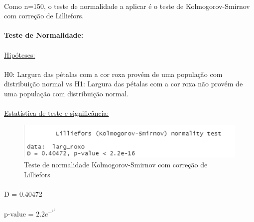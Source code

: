 \documentclass{article}
\begin{document}
\paragraph{} Como n=150, o teste de normalidade a aplicar é o teste de Kolmogorov-Smirnov com correção de Lilliefors.
\paragraph{} 
\textbf{Teste de Normalidade:}
\paragraph{}
\underline{Hipóteses:}
\paragraph{} H0: Largura das pétalas com a cor roxa provém de uma população com distribuição normal vs H1: Largura das pétalas com a cor roxa não provém de uma população com distribuição normal.

\paragraph{}

\paragraph{} \underline{Estatística de teste e significância:}

\begin{figure}[h]
       \centering %
        \includegraphics[scale=0.8]{teste_de_normalidade_para_a_2a_hipotese.png} 
       \caption{Teste de normalidade Kolmogorov-Smirnov com correção de Lilliefors}
       \label{fig:logo}
    \end{figure}
    
\paragraph{} D = 0.40472 
\paragraph{} p-value = \begin{math}2.2e^-^1^6\end{math}
\end{document}
